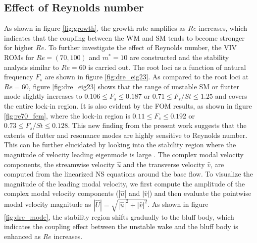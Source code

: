 \documentclass{jfm}
\begin{document}
\subsection{Effect of Reynolds number}\label{sec:ReEffect}
As shown in figure \ref{fig:growth}, the growth rate amplifies as $Re$ increases, 
which indicates that the coupling between the WM and SM tends to become stronger for higher $Re$. 
To further investigate the effect of Reynolds number, 
the VIV ROMs for $Re=(70,100)$ and $m^*=10$ are constructed and the 
stability analysis similar to $Re=60$ is carried out. 
The root loci as a function of natural frequency $F_s$ are shown in 
figure \ref{fig:dre_eig23}. As compared to the root loci at $Re=60$, figure \ref{fig:dre_eig23} 
shows that the range of unstable SM or flutter mode slightly increases 
to $0.106 \le F_s \le 0.187$ or $0.71 \le F_s/St \le 1.25$ 
and covers the entire lock-in region. 
%
It is also evident by the FOM results, as shown in figure \ref{fig:re70_fem}, 
where the lock-in region 
is  $0.11 \le F_s \le 0.192$ or $0.73 \le F_s/St \le 0.128$. 
This new finding from the present work 
suggests that the extents of flutter and resonance modes are highly sensitive 
to Reynolds number. 
%
This can be further elucidated by looking into the stability region 
where the magnitude of velocity leading eigenmode
is large \citep{Luchini2007}. 
The complex modal velocity components, 
the streamwise velocity $\widehat{u}$ 
and the transverse velocity $\widehat{v}$, 
are computed from the linearized NS equations around the base flow. 
To visualize the magnitude of the leading modal velocity, 
we first compute the amplitude of the complex modal velocity components ($|\widehat{u}|$ and $|\widehat{v}|$)
and then evaluate the pointwise modal velocity magnitude 
as $|\widehat{U}|=\sqrt{|\widehat{u}|^2+|\widehat{v}|^2}$.
As shown in figure \ref{fig:dre_mode}, the stability
region shifts gradually to the bluff body, which indicates the coupling 
effect between the unstable wake and the bluff body is enhanced 
as $Re$ increases.

 
\end{document}
